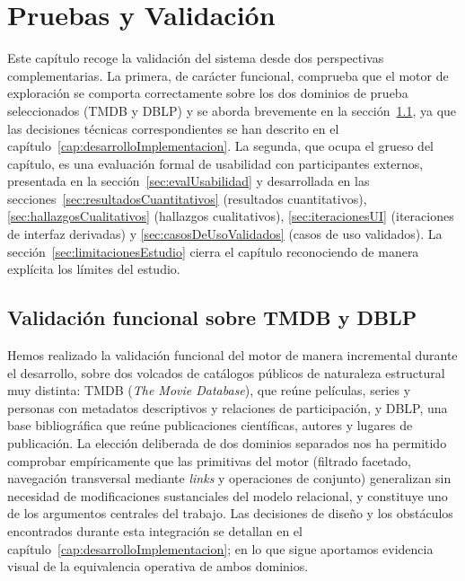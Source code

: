 \chapter{Pruebas y Validación}
\label{cap:pruebasValidacion}


Este capítulo recoge la validación del sistema desde dos perspectivas complementarias.
La primera, de carácter funcional, comprueba que el motor de exploración se comporta
correctamente sobre los dos dominios de prueba seleccionados (TMDB y DBLP) y se aborda
brevemente en la sección~\ref{sec:validacionFuncional}, ya que las decisiones técnicas
correspondientes se han descrito en el capítulo~\ref{cap:desarrolloImplementacion}. La
segunda, que ocupa el grueso del capítulo, es una evaluación formal de usabilidad con
participantes externos, presentada en la sección~\ref{sec:evalUsabilidad} y desarrollada
en las secciones~\ref{sec:resultadosCuantitativos} (resultados cuantitativos),
\ref{sec:hallazgosCualitativos} (hallazgos cualitativos),
\ref{sec:iteracionesUI} (iteraciones de interfaz derivadas) y
\ref{sec:casosDeUsoValidados} (casos de uso validados). La sección~\ref{sec:limitacionesEstudio}
cierra el capítulo reconociendo de manera explícita los límites del estudio.

\section{Validación funcional sobre TMDB y DBLP}
\label{sec:validacionFuncional}

Hemos realizado la validación funcional del motor de manera incremental durante el desarrollo,
sobre dos volcados de catálogos públicos de naturaleza estructural muy distinta: TMDB
(\textit{The Movie Database}), que reúne películas, series y personas con metadatos descriptivos
y relaciones de participación, y DBLP, una base bibliográfica que reúne publicaciones
científicas, autores y lugares de publicación. La elección deliberada de dos dominios separados
nos ha permitido comprobar empíricamente que las primitivas del motor (filtrado facetado, navegación
transversal mediante \textit{links} y operaciones de conjunto) generalizan sin necesidad de
modificaciones sustanciales del modelo relacional, y constituye uno de los argumentos centrales
del trabajo. Las decisiones de diseño y los obstáculos encontrados durante esta integración se
detallan en el capítulo~\ref{cap:desarrolloImplementacion}; en lo que sigue aportamos evidencia
visual de la equivalencia operativa de ambos dominios.

